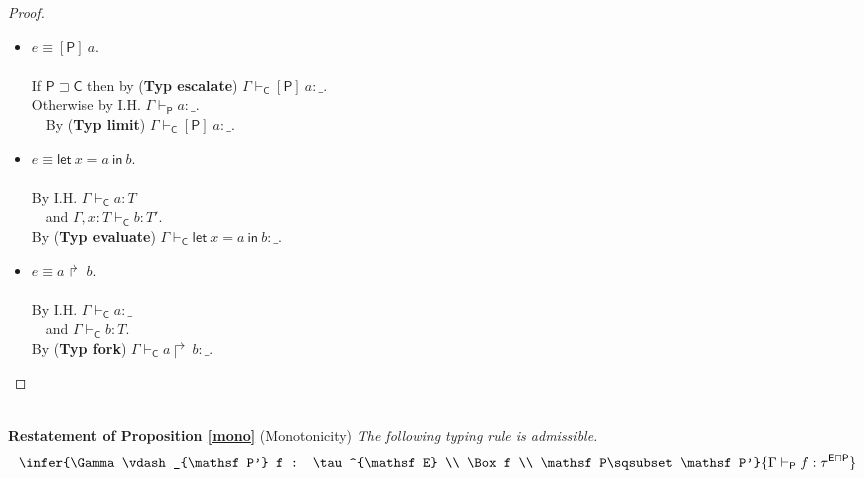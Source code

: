 \documentclass{sigplanconf}
\newcommand{\labp}{\mathsf P}
\newcommand{\labb}{\mathsf S}
\newcommand{\labt}{\mathsf E}
\newcommand{\labc}{\mathsf C}
\newcommand{\fork}[2]{#1\Rsh\:\!#2}
\newcommand{\eval}[3]{\mathsf{let}~#1=#2~\mathsf{in}~#3}
\newcommand{\trule}[1]{(\textbf{Typ #1})}
\begin{document}
\begin{proof}
\begin{itemize}
$ $
\item $e \equiv [\labp]~a$.\\
\\
If $\labp \sqsupset \labc$ then by \trule{escalate} $\Gamma \vdash_{\labc} [\labp]~a : \_$.\\
Otherwise by I.H. $\Gamma \vdash_{\labp} a : \_$.\\
$~~~$ By \trule{limit} $\Gamma \vdash_{\labc} [\labp]~a : \_$.\\
\item $e \equiv \eval x a b$.\\
\\
By I.H. $\Gamma \vdash_{\labc} a : T$\\
$~~~$ and  $\Gamma, x: T \vdash_{\labc} b : T'$.\\
By \trule{evaluate} $\Gamma \vdash_{\labc} \eval x a b : \_$.\\
\item $e \equiv \fork a b$.\\
\\
By I.H. $\Gamma \vdash_{\labc} a : \_$\\
$~~~$ and  $\Gamma \vdash_{\labc} b : T$.\\
By \trule{fork} $\Gamma \vdash_{\labc} \fork a b : \_$.  \qedhere
\end{itemize}
\end{proof}
$ $\\
{\bf Restatement of Proposition \ref{mono}} (Monotonicity) {\em
The following typing rule is admissible.
$$
\infer
    {\Gamma \vdash_{\labp'} f : \tau^{\labt} \\ \Box f \\ \labp \sqsubset \labp'}
    {\Gamma \vdash_{\labp} f : \tau^{\labt \sqcap \labp}}
$$
}
\end{document}
